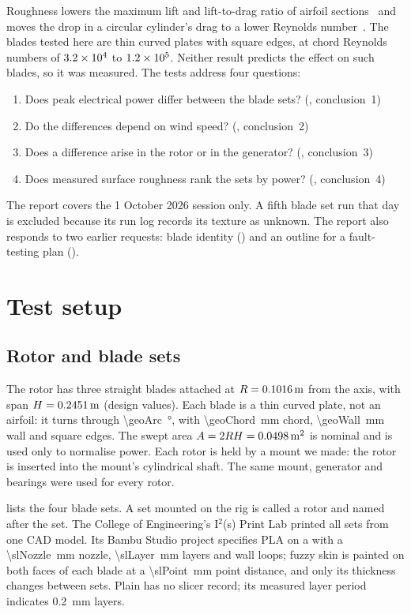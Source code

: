 \documentclass[11pt]{article}
\begin{document}
Roughness lowers the maximum lift and lift-to-drag ratio of airfoil sections~\cite{wilcox} and
moves the drop in a circular cylinder's drag to a lower Reynolds number~\cite{achenbach}. The blades
tested here are thin curved plates with square edges, at chord Reynolds numbers of
$3.2\times10^4$ to $1.2\times10^5$. Neither result predicts the effect on such blades, so it
was measured. The tests address four questions:
\begin{enumerate}
  \item Does peak electrical power differ between the blade sets? (,
        conclusion~1)
  \item Do the differences depend on wind speed? (, conclusion~2)
  \item Does a difference arise in the rotor or in the generator? (,
        conclusion~3)
  \item Does measured surface roughness rank the sets by power? (,
        conclusion~4)
\end{enumerate}
The report covers the 1 October 2026 session only. A fifth blade set run that day is excluded
because its run log records its texture as unknown. The report also responds to two earlier
requests: blade identity () and an outline for a fault-testing plan
().

\section{Test setup}\label{sec:setup}

\subsection{Rotor and blade sets}\label{sec:rotor}
The rotor has three straight blades attached at $R=\SI{0.1016}{m}$ from the axis, with span
$H=\SI{0.2451}{m}$ (design values). Each blade is a thin curved plate, not an airfoil: it turns
through \SI{\geoArc}{\degree}, with \SI{\geoChord}{mm} chord, \SI{\geoWall}{mm} wall and square
edges. The swept area $A=2RH=\SI{0.0498}{m^2}$ is nominal and is used only to normalise power.
Each rotor is held by a mount we made: the rotor is inserted into the mount's cylindrical shaft.
The same mount, generator and bearings were used for every rotor.

 lists the four blade sets. A set mounted on the rig is called a rotor and
named after the set. The College of Engineering's I$^2$(s) Print Lab printed all sets from one CAD
model. Its Bambu Studio project specifies PLA on a \slPrinter{} with a \SI{\slNozzle}{mm} nozzle,
\SI{\slLayer}{mm} layers and \slWalls{} wall loops; fuzzy skin is painted on both faces of each
blade at a \SI{\slPoint}{mm} point distance, and only its thickness changes between sets. Plain has
no slicer record; its measured layer period indicates \SI{0.2}{mm} layers.
\end{document}
